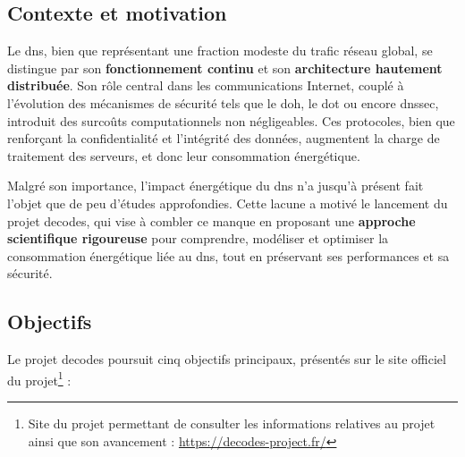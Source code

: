 \documentclass[12pt, a4paper]{report}
\begin{document}
	\subsection{Contexte et motivation}
	Le \gls{dns}, bien que représentant une fraction modeste du trafic réseau global, se distingue par son \textbf{fonctionnement continu} et son \textbf{architecture hautement distribuée}. Son rôle central dans les communications Internet, couplé à l'évolution des mécanismes de sécurité tels que le \gls{doh}, le \gls{dot} ou encore \gls{dnssec}, introduit des surcoûts computationnels non négligeables. Ces protocoles, bien que renforçant la confidentialité et l'intégrité des données, augmentent la charge de traitement des serveurs, et donc leur consommation énergétique.

	Malgré son importance, l'impact énergétique du \gls{dns} n'a jusqu'à présent fait l'objet que de peu d'études approfondies. Cette lacune a motivé le lancement du projet \gls{decodes}, qui vise à combler ce manque en proposant une \textbf{approche scientifique rigoureuse} pour comprendre, modéliser et optimiser la consommation énergétique liée au \gls{dns}, tout en préservant ses performances et sa sécurité.

	\subsection{Objectifs}
	Le projet \gls{decodes} poursuit cinq objectifs principaux, présentés sur le site officiel du projet\footnote{Site du projet permettant de consulter les informations relatives au projet ainsi que son avancement : \url{https://decodes-project.fr/}} :
\end{document}
